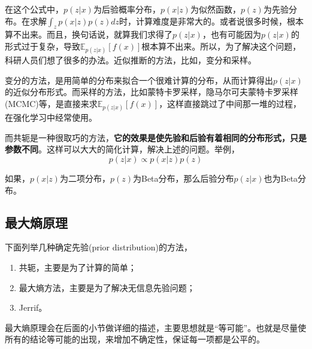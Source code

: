 \documentclass[a4paper]{article}
\begin{document}
在这个公式中，$p(z|x)$为后验概率分布，$p(x|z)$为似然函数，$p(z)$为先验分布。在求解$\int_{z}p(x|z)p(z)dz$时，计算难度是非常大的。或者说很多时候，根本算不出来。而且，换句话说，就算我们求得了$p(z|x)$，也有可能因为$p(z|x)$的形式过于复杂，导致$\mathbb{E}_{p(z|x)}[f(x)]$根本算不出来。所以，为了解决这个问题，科研人员们想了很多的办法。近似推断的方法，比如，变分和采样。

变分的方法，是用简单的分布来拟合一个很难计算的分布，从而计算得出$p(z|x)$的近似分布形式。而采样的方法，比如蒙特卡罗采样，隐马尔可夫蒙特卡罗采样(MCMC)等，是直接来求$\mathbb{E}_{p(z|x)}[f(x)]$，这样直接跳过了中间那一堆的过程，在强化学习中经常使用。

而共轭是一种很取巧的方法，\textbf{它的效果是使先验和后验有着相同的分布形式，只是参数不同}。这样可以大大的简化计算，解决上述的问题。举例，
\begin{equation}
    p(z|x)\varpropto p(x|z)p(z)
\end{equation}

如果，$p(x|z)$为二项分布，$p(z)$为Beta分布，那么后验分布$p(z|x)$也为Beta分布。

\subsection{最大熵原理}
下面列举几种确定先验(prior distribution)的方法，
\begin{enumerate}[itemindent = 1em, itemsep = 0.4pt, parsep=0.5pt, topsep = 0.5pt]
\item 共轭，主要是为了计算的简单；
\item 最大熵方法，主要是为了解决无信息先验问题；
\item Jerrif。
\end{enumerate}

最大熵原理会在后面的小节做详细的描述，主要思想就是“等可能”。也就是尽量使所有的结论等可能的出现，来增加不确定性，保证每一项都是公平的。
\end{document}
